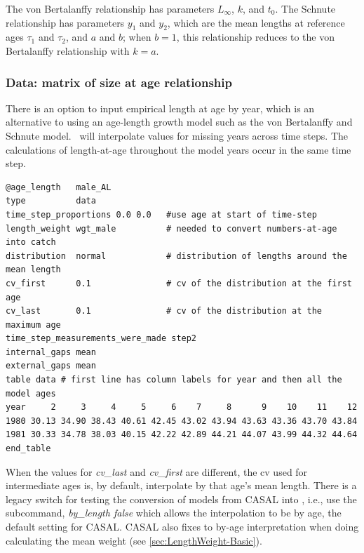 The von Bertalanffy relationship has parameters $L_\infty$, $k$, and $t_0$. The Schnute relationship \citep{836} has parameters $y_1$ and $y_2$, which are the mean lengths at reference ages $\tau_1$ and $\tau_2$, and $a$ and $b$; when $b=1$, this relationship reduces to the von Bertalanffy relationship with $k=a$.

\subsubsection{Data: matrix of size at age relationship}\label{sec:AgeLength-Data}

There is an option to input empirical length at age by year, which is an alternative to using an age-length growth model such as the von Bertalanffy and Schnute model. \CNAME\ will interpolate values for missing years across time steps. The calculations of length-at-age throughout the model years occur in the same time step.

{\small{\begin{verbatim}
@age_length   male_AL
type          data
time_step_proportions 0.0 0.0   #use age at start of time-step
length_weight wgt_male          # needed to convert numbers-at-age into catch
distribution  normal            # distribution of lengths around the mean length
cv_first      0.1               # cv of the distribution at the first age
cv_last       0.1               # cv of the distribution at the maximum age
time_step_measurements_were_made step2
internal_gaps mean
external_gaps mean
table data # first line has column labels for year and then all the model ages
year     2     3     4     5     6    7     8      9    10    11    12
1980 30.13 34.90 38.43 40.61 42.45 43.02 43.94 43.63 43.36 43.70 43.84
1981 30.33 34.78 38.03 40.15 42.22 42.89 44.21 44.07 43.99 44.32 44.64
end_table
\end{verbatim}}}

When the values for \textit{cv\_last} and \textit{cv\_first} are different, the cv used for intermediate ages is, by default, interpolate by that age's mean length. There is a legacy switch for testing the conversion of models from CASAL into \CNAME, i.e., use the subcommand, \textit{by\_length false} which allows the interpolation to be by age, the default setting for CASAL. CASAL also fixes to by-age interpretation when doing calculating the mean weight (see \ref{sec:LengthWeight-Basic}).


